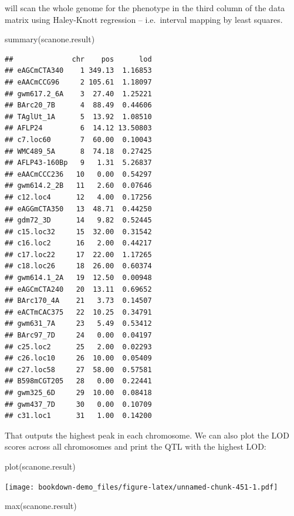 \documentclass[
]{book}
\newenvironment{Shaded}{\begin{snugshade}}{\end{snugshade}}
\newcommand{\FunctionTok}[1]{\textcolor[rgb]{0.00,0.00,0.00}{#1}}
\newcommand{\NormalTok}[1]{#1}
\begin{document}
will scan the whole genome for the phenotype in the third column of the data matrix using Haley-Knott regression -- i.e.~interval mapping by least squares.

\begin{Shaded}
\begin{Highlighting}[]
\FunctionTok{summary}\NormalTok{(scanone.result)}
\end{Highlighting}
\end{Shaded}

\begin{verbatim}
##              chr    pos      lod
## eAGCmCTA340    1 349.13  1.16853
## eAACmCCG96     2 105.61  1.18097
## gwm617.2_6A    3  27.40  1.25221
## BArc20_7B      4  88.49  0.44606
## TAglUt_1A      5  13.92  1.08510
## AFLP24         6  14.12 13.50803
## c7.loc60       7  60.00  0.10043
## WMC489_5A      8  74.18  0.27425
## AFLP43-160Bp   9   1.31  5.26837
## eAACmCCC236   10   0.00  0.54297
## gwm614.2_2B   11   2.60  0.07646
## c12.loc4      12   4.00  0.17256
## eAGGmCTA350   13  48.71  0.44250
## gdm72_3D      14   9.82  0.52445
## c15.loc32     15  32.00  0.31542
## c16.loc2      16   2.00  0.44217
## c17.loc22     17  22.00  1.17265
## c18.loc26     18  26.00  0.60374
## gwm614.1_2A   19  12.50  0.00948
## eAGCmCTA240   20  13.11  0.69652
## BArc170_4A    21   3.73  0.14507
## eACTmCAC375   22  10.25  0.34791
## gwm631_7A     23   5.49  0.53412
## BArc97_7D     24   0.00  0.04197
## c25.loc2      25   2.00  0.02293
## c26.loc10     26  10.00  0.05409
## c27.loc58     27  58.00  0.57581
## B598mCGT205   28   0.00  0.22441
## gwm325_6D     29  10.00  0.08418
## gwm437_7D     30   0.00  0.10709
## c31.loc1      31   1.00  0.14200
\end{verbatim}

That outputs the highest peak in each chromosome. We can also plot the LOD scores across all chromosomes and print the QTL with the highest LOD:

\begin{Shaded}
\begin{Highlighting}[]
\FunctionTok{plot}\NormalTok{(scanone.result)}
\end{Highlighting}
\end{Shaded}

\texttt{[image: bookdown-demo\_files/figure-latex/unnamed-chunk-451-1.pdf]}

\begin{Shaded}
\begin{Highlighting}[]
\FunctionTok{max}\NormalTok{(scanone.result)}
\end{Highlighting}
\end{Shaded}
\end{document}
